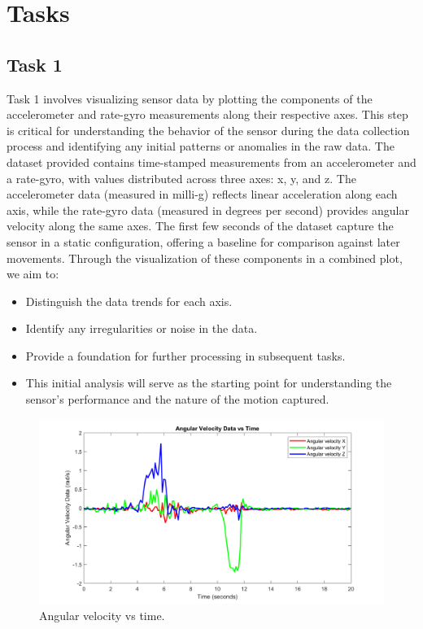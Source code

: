 \documentclass[12pt]{article}
\begin{document}
\newpage

\section{Tasks}

\subsection{Task 1}

Task 1 involves visualizing sensor data by plotting the components of the accelerometer and rate-gyro measurements along their respective axes. This step is critical for understanding the behavior of the sensor during the data collection process and identifying any initial patterns or anomalies in the raw data.
The dataset provided contains time-stamped measurements from an accelerometer and a rate-gyro, with values distributed across three axes: x, y, and z. The accelerometer data (measured in milli-g) reflects linear acceleration along each axis, while the rate-gyro data (measured in degrees per second) provides angular velocity along the same axes. The first few seconds of the dataset capture the sensor in a static configuration, offering a baseline for comparison against later movements.
Through the visualization of these components in a combined plot, we aim to:

\begin{itemize}
    \item Distinguish the data trends for each axis.
    \item Identify any irregularities or noise in the data.
    \item Provide a foundation for further processing in subsequent tasks.
    \item This initial analysis will serve as the starting point for understanding the sensor's performance and the nature of the motion captured.
\end{itemize}


\begin{figure}[H]
    \centerline{\includegraphics[scale=0.7]{Imagens/angularvstime.png}}
    \caption{Angular velocity vs time.}
    \label{fig}
\end{figure}
\end{document}
